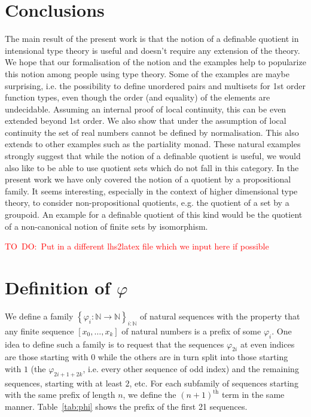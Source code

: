 \documentclass[envcountsame]{llncs}
\newcommand{\todo}[1]{\textcolor{red}{TO~DO:~#1}}
\newcommand{\N}{\mathbb{N}}
\providecommand{\set}  [1]{\left\{#1\right\}}
\begin{document}
\section{Conclusions}
\label{sec:conclusions}

The main result of the present work is that the notion of a definable
quotient in intensional type theory is useful and doesn't require any
extension of the theory. We hope that our formalisation of the notion
and the examples help to popularize this notion among people using
type theory. Some of the examples are maybe surprising, i.e. the
possibility to define unordered pairs and multisets for 1st order
function types, even though the order (and equality) of the elements
are undecidable. Assuming an internal proof of local continuity, this
can be even extended beyond 1st order. We also show that under the
assumption of local continuity the set of real numbers cannot be
defined by normalisation. This also extends to other examples such as
the partiality monad. These natural examples strongly suggest that
while the notion of a definable quotient is useful, we would also like
to be able to use quotient sets which do not fall in this category.
In the present work we have only covered the notion of a quotient by a
propositional family. It seems interesting, especially in the
context of higher dimensional type theory, to consider
non-propositional quotients, e.g. the quotient of a set by a
groupoid. An example for a definable quotient of this kind would be
the quotient of a non-canonical notion of finite sets by isomorphism. 




\appendix

\todo{Put in a different lhs2latex file which we input here if possible}
\section{Definition of $\varphi$}
We define a family $\set{\varphi_i:\N\to\N}_{i:\N}$ of natural sequences with the property that any finite sequence $[x_0,\dots,x_k]$ of natural numbers is a prefix of some $\varphi_i$. One idea to define such a family is to request that the sequences $\varphi_{2i}$ at even indices are those starting with $0$ while the others are in turn split into  those starting with $1$ (the $\varphi_{2i+1+2k}$, i.e. every other sequence of odd index) and the remaining sequences, starting with at least $2$, etc. For each subfamily of sequences starting with the same prefix of length $n$, we define the $(n+1)^{\text{th}}$ term in the same manner.
Table~\ref{tab:phi} shows the prefix of the first 21 sequences.
\end{document}
